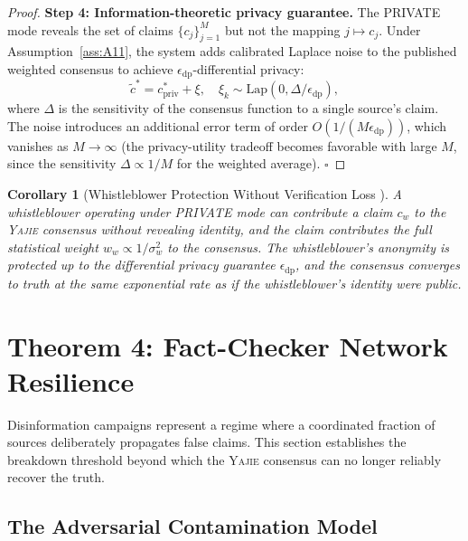 \documentclass[11pt,a4paper]{article}
\newtheorem{corollary}[theorem]{Corollary}
\theoremstyle{definition}
\newcommand{\Yajie}{\textsc{Yajie}}
\newcommand{\VISprivate}{\textsc{PRIVATE}}
\begin{document}
\begin{proof}
\textbf{Step 4: Information-theoretic privacy guarantee.} The \VISprivate{} mode reveals the set of claims $\{c_j\}_{j=1}^{M}$ but not the mapping $j \mapsto c_j$. Under Assumption~\ref{ass:A11}, the system adds calibrated Laplace noise to the published weighted consensus to achieve $\epsilon_{\mathrm{dp}}$-differential privacy:
\begin{equation}
    \tilde{c}^* = c^*_{\mathrm{priv}} + \xi, \quad \xi_k \sim \mathrm{Lap}(0, \Delta / \epsilon_{\mathrm{dp}}),
    \label{eq:dp_noise}
\end{equation}
where $\Delta$ is the sensitivity of the consensus function to a single source's claim. The noise introduces an additional error term of order $O(1/(M\epsilon_{\mathrm{dp}}))$, which vanishes as $M \to \infty$ (the privacy-utility tradeoff becomes favorable with large $M$, since the sensitivity $\Delta \propto 1/M$ for the weighted average). $\square$
\end{proof}

\begin{corollary}[Whistleblower Protection Without Verification Loss ]
\label{cor:whistleblower}
A whistleblower operating under \VISprivate{} mode can contribute a claim $c_w$ to the \Yajie{} consensus without revealing identity, and the claim contributes the full statistical weight $w_w \propto 1/\sigma_w^2$ to the consensus. The whistleblower's anonymity is protected up to the differential privacy guarantee $\epsilon_{\mathrm{dp}}$, and the consensus converges to truth at the same exponential rate as if the whistleblower's identity were public.
\end{corollary}

\section{Theorem 4: Fact-Checker Network Resilience }
\label{sec:resilience}

Disinformation campaigns represent a regime where a coordinated fraction of sources deliberately propagates false claims. This section establishes the breakdown threshold beyond which the \Yajie{} consensus can no longer reliably recover the truth.

\subsection{The Adversarial Contamination Model}
\end{document}
